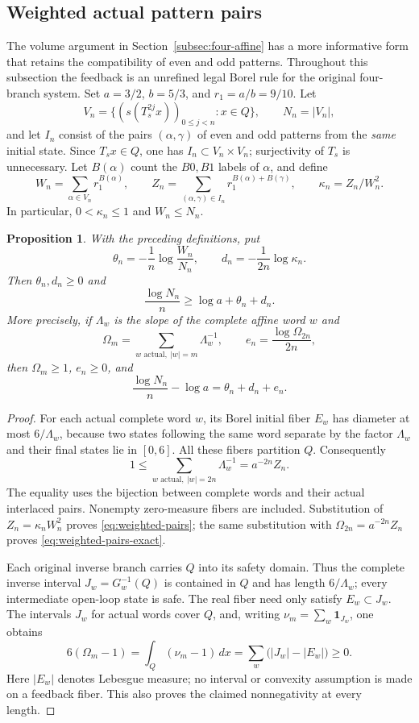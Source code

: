 \documentclass[11pt,reqno]{amsart}
\numberwithin{equation}{section}
\newtheorem{proposition}[theorem]{Proposition}
\theoremstyle{definition}
\newcommand{\one}{\mathbf 1}
\begin{document}
\subsection{Weighted actual pattern pairs}
The volume argument in Section~\ref{subsec:four-affine} has a
more informative form that retains the compatibility of even
and odd patterns. Throughout this subsection the feedback is
an unrefined legal Borel rule for the original four-branch system.
Set $a=3/2$, $b=5/3$, and $r_1=a/b=9/10$. Let
\[
 V_n=\{(s(T_s^{2j}x))_{0\le j<n}:x\in Q\},\qquad N_n=|V_n|,
\]
and let $I_n$ consist of the pairs $(\alpha,\gamma)$ of even
and odd patterns from the \emph{same} initial state. Since
$T_sx\in Q$, one has $I_n\subset V_n\times V_n$; surjectivity
of $T_s$ is unnecessary. Let $B(\alpha)$ count the $B0,B1$
labels of $\alpha$, and define
\[
 W_n=\sum_{\alpha\in V_n}r_1^{B(\alpha)},\qquad
 Z_n=\sum_{(\alpha,\gamma)\in I_n}
            r_1^{B(\alpha)+B(\gamma)},\qquad
 \kappa_n=Z_n/W_n^2.
\]
In particular, $0<\kappa_n\le1$ and $W_n\le N_n$.

\begin{proposition}\label{prop:weighted-pairs}
With the preceding definitions, put
\[
 \theta_n=-\frac1n\log\frac{W_n}{N_n},\qquad
 d_n=-\frac1{2n}\log\kappa_n.
\]
Then $\theta_n,d_n\ge0$ and
\begin{equation}\label{eq:weighted-pairs}
 \frac{\log N_n}{n}\ge\log a+\theta_n+d_n.
\end{equation}
More precisely, if $\Lambda_w$ is the slope of the complete
affine word $w$ and
\[
 \Omega_m=\sum_{w\text{ actual},\ |w|=m}\Lambda_w^{-1},
 \qquad e_n=\frac{\log\Omega_{2n}}{2n},
\]
then $\Omega_m\ge1$, $e_n\ge0$, and
\begin{equation}\label{eq:weighted-pairs-exact}
 \frac{\log N_n}{n}-\log a=\theta_n+d_n+e_n.
\end{equation}
\end{proposition}
\begin{proof}
For each actual complete word $w$, its Borel initial fiber
$E_w$ has diameter at most $6/\Lambda_w$, because two states
following the same word separate by the factor $\Lambda_w$
and their final states lie in $[0,6]$. All these fibers partition
$Q$. Consequently
\[
 1\le\sum_{w\text{ actual},\ |w|=2n}\Lambda_w^{-1}
       =a^{-2n}Z_n.
\]
The equality uses the bijection between complete words and their
actual interlaced pairs. Nonempty zero-measure fibers are included.
Substitution of $Z_n=\kappa_nW_n^2$ proves
\eqref{eq:weighted-pairs}; the same substitution with
$\Omega_{2n}=a^{-2n}Z_n$ proves
\eqref{eq:weighted-pairs-exact}.

Each original inverse branch carries $Q$ into its safety domain.
Thus the complete inverse interval $J_w=G_w^{-1}(Q)$ is contained
in $Q$ and has length $6/\Lambda_w$; every intermediate open-loop
state is safe. The real fiber need only satisfy $E_w\subset J_w$.
The intervals $J_w$ for actual words cover $Q$, and, writing
$\nu_m=\sum_w\one_{J_w}$, one obtains
\[
 6(\Omega_m-1)=\int_Q(\nu_m-1)\,dx
              =\sum_w\bigl(|J_w|-|E_w|\bigr)\ge0.
\]
Here $|E_w|$ denotes Lebesgue measure; no interval or convexity
assumption is made on a feedback fiber. This also proves the
claimed nonnegativity at every length.
\end{proof}
\end{document}
